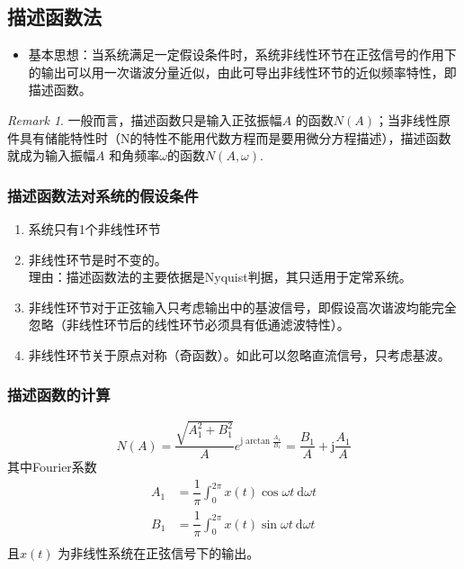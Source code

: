 \documentclass[14pt,a4paper]{article}
\theoremstyle{plain}
\theoremstyle{definition}
\theoremstyle{remark}
\newtheorem{rmk}{Remark}[section]
\theoremstyle{plain}
\theoremstyle{plain}
\theoremstyle{plain}
\theoremstyle{definition}
\theoremstyle{remark}
\numberwithin{equation}{section}
\begin{document}
		\subsection{描述函数法}%
		\label{sub:描述函数法}

			\begin{itemize}
				\item 基本思想：当系统满足一定假设条件时，系统非线性环节在正弦信号的作用下的输出可以用一次谐波分量近似，由此可导出非线性环节的近似频率特性，即描述函数。
			\end{itemize}

			\begin{rmk}  
				一般而言，描述函数只是输入正弦振幅$A$ 的函数$N(A)$；当非线性原件具有储能特性时（N的特性不能用代数方程而是要用微分方程描述），描述函数就成为输入振幅$A$ 和角频率$\omega$的函数$N\left( A,\omega  \right) $. 
			\end{rmk} 

			\subsubsection{描述函数法对系统的假设条件}%
			\label{ssub:描述函数法对系统的假设条件}

				\begin{enumerate}
					\item 系统只有1个非线性环节
					\item 非线性环节是时不变的。\\
						理由：描述函数法的主要依据是Nyquist判据，其只适用于定常系统。
					\item 非线性环节对于正弦输入只考虑输出中的基波信号，即假设高次谐波均能完全忽略（非线性环节后的线性环节必须具有低通滤波特性）。
					\item 非线性环节关于原点对称（奇函数）。如此可以忽略直流信号，只考虑基波。 
				\end{enumerate} 

			\subsubsection{描述函数的计算}%
			\label{ssub:描述函数的计算}
			
				\begin{equation}
				\label{eq:describingfunction}
				N(A) = \dfrac{\sqrt{A_1^2+B_1^2}}{A} e^{\mathrm{j} \arctan \frac{A_1}{B_1}} =   \dfrac{B_1}{A}+ \mathrm{j}\dfrac{A_1}{A}
				\end{equation} 
				其中Fourier系数
				\[
				\begin{split}
					A_1 &= \dfrac{1}{\pi} \int_0^{2\pi} x(t) \cos \omega t \ \mathrm d \omega t \\ 
					B_1 &= \dfrac{1}{\pi} \int_0^{2\pi} x(t) \sin \omega t \ \mathrm d \omega t \\ 
				\end{split}
				\]
				且$x(t)$ 为非线性系统在正弦信号下的输出。
		
\end{document}
